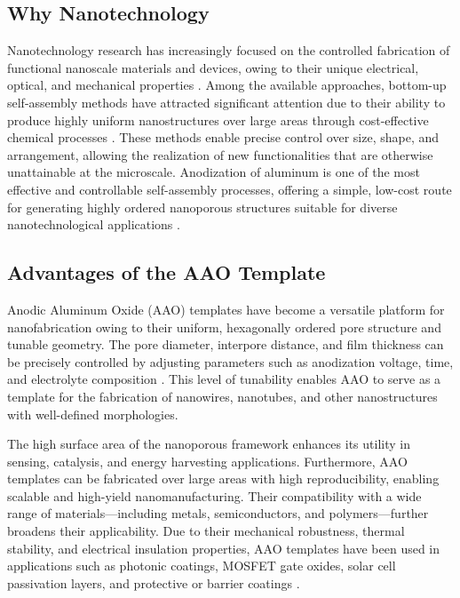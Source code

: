 \documentclass{rapportCS}
\begin{document}
	\subsection{Why Nanotechnology}
	Nanotechnology research has increasingly focused on the controlled fabrication of functional nanoscale materials and devices, owing to their unique electrical, optical, and mechanical properties \cite{eessaa2023review}. Among the available approaches, bottom-up self-assembly methods have attracted significant attention due to their ability to produce highly uniform nanostructures over large areas through cost-effective chemical processes \cite{eessaa2023review}. These methods enable precise control over size, shape, and arrangement, allowing the realization of new functionalities that are otherwise unattainable at the microscale. Anodization of aluminum is one of the most effective and controllable self-assembly processes, offering a simple, low-cost route for generating highly ordered nanoporous structures suitable for diverse nanotechnological applications \cite{eessaa2023review}.

	\subsection{Advantages of the AAO Template}
	Anodic Aluminum Oxide (AAO) templates have become a versatile platform for nanofabrication owing to their uniform, hexagonally ordered pore structure and tunable geometry. The pore diameter, interpore distance, and film thickness can be precisely controlled by adjusting parameters such as anodization voltage, time, and electrolyte composition \cite{eessaa2023review}. This level of tunability enables AAO to serve as a template for the fabrication of nanowires, nanotubes, and other nanostructures with well-defined morphologies.

	The high surface area of the nanoporous framework enhances its utility in sensing, catalysis, and energy harvesting applications. Furthermore, AAO templates can be fabricated over large areas with high reproducibility, enabling scalable and high-yield nanomanufacturing. Their compatibility with a wide range of materials—including metals, semiconductors, and polymers—further broadens their applicability. Due to their mechanical robustness, thermal stability, and electrical insulation properties, AAO templates have been used in applications such as photonic coatings, MOSFET gate oxides, solar cell passivation layers, and protective or barrier coatings \cite{eessaa2023review}.
\end{document}

